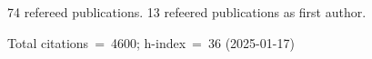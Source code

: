 74 refereed publications. 13 refeered publications as first author.

Total citations~=~4600; h-index~=~36 (2025-01-17)